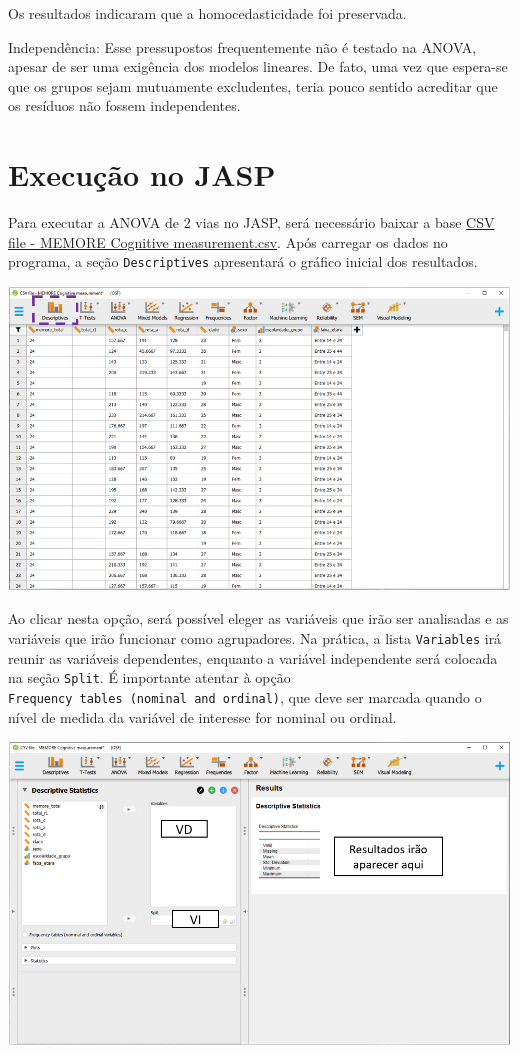 \documentclass[
]{book}
\begin{document}
Os resultados indicaram que a homocedasticidade foi preservada.

Independência: Esse pressupostos frequentemente não é testado na ANOVA,
apesar de ser uma exigência dos modelos lineares. De fato, uma vez que
espera-se que os grupos sejam mutuamente excludentes, teria pouco
sentido acreditar que os resíduos não fossem independentes.

\hypertarget{execuuxe7uxe3o-no-jasp-7}{%
\section{Execução no JASP}\label{execuuxe7uxe3o-no-jasp-7}}

Para executar a ANOVA de 2 vias no JASP, será necessário baixar a base
\href{https://osf.io/4hdc2/}{CSV file - MEMORE Cognitive
measurement.csv}. Após carregar os dados no programa, a seção
\texttt{Descriptives} apresentará o gráfico inicial dos resultados.

\includegraphics{./img/cap_anova_two_way_descriptives.png}

Ao clicar nesta opção, será possível eleger as variáveis que irão ser
analisadas e as variáveis que irão funcionar como agrupadores. Na
prática, a lista \texttt{Variables} irá reunir as variáveis dependentes,
enquanto a variável independente será colocada na seção \texttt{Split}.
É importante atentar à opção
\texttt{Frequency\ tables\ (nominal\ and\ ordinal)}, que deve ser
marcada quando o nível de medida da variável de interesse for nominal ou
ordinal.

\includegraphics{./img/cap_anova_two_way_descriptives2.png}
\end{document}
